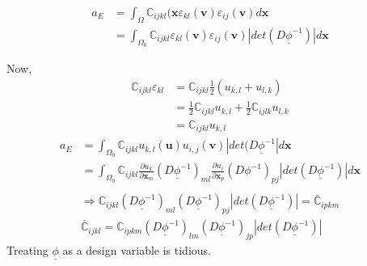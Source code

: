 \documentclass[10pt]{article}
\begin{document}
\begin{equation}
\begin{split}
a_E &=\int_\Omega \mathbb{C}_{ijkl}(\textbf{x}\varepsilon_{kl}(\textbf{v})\varepsilon_{ij}(\textbf{v})d\textbf{x}\\
&=\int_{\Omega_0} \mathbb{C}_{ijkl}\varepsilon_{kl}(\textbf{v})\varepsilon_{ij}(\textbf{v})|det(D\underline{\phi}^{-1})|d\textbf{x}
\end{split}
\end{equation}

Now,
\begin{equation}	\label{compliance}
\begin{split}
\mathbb{C}_{ijkl} \varepsilon_{kl} &= \mathbb{C}_{ijkl}\frac{1}{2}(u_{k,l}+u_{l,k})\\
 & =\frac{1}{2}\mathbb{C}_{ijkl}u_{k,l}+\frac{1}{2}\mathbb{C}_{ijlk}u_{l,k}\\
 & =\mathbb{C}_{ijkl}u_{k,l}
\end{split}
\end{equation}
\begin{equation}
\begin{split}
a_E &= \int_{\Omega_0}\mathbb{C}_{ijkl}u_{k,l}(\textbf{u})u_{i,j}(\textbf{v})|det(D\underline{\phi}^{-1}|d\textbf{x}\\
&= \int_{\Omega_0}\mathbb{C}_{ijkl}\frac{\partial u_k}{\partial\textbf{x}_m}(D\underline{\phi}^{-1})_{ml}\frac{\partial u_i}{\partial \textbf{x}_p}(D\phi^{-1})_{pj}|det(D\underline{\phi}^{-1})|d\textbf{x}\\
\end{split}
\end{equation}
\begin{eqnarray}
\Rightarrow \mathbb{C}_{ijkl}(D\underline{\phi}^{-1})_{ml}(D\underline{\phi}^{-1})_{pj}|det(D\underline{\phi}^{-1})| = \bar{\mathbb{C}}_{ipkm}\\
\bar{\mathbb{C}}_{ijkl} = \mathbb{C}_{ipkm}(D\underline{\phi}^{-1})_{lm}(D\underline{\phi}^{-1})_{jp}|det(D\underline{\phi}^{-1})|
\end{eqnarray}
Treating $\underline{\phi}$ as a design variable is tidious.
\end{document}
